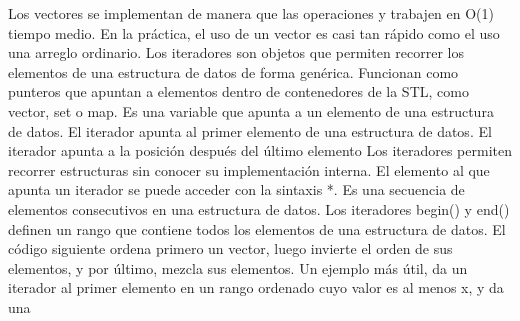 {}Los vectores se implementan de manera que las operaciones  y  trabajen en O(1) tiempo medio.\markdownRendererParagraphSeparator
{}En la práctica, el uso de un vector es casi tan rápido como el uso una arreglo ordinario.\markdownRendererParagraphSeparator
{}
\markdownRendererSectionEnd \markdownRendererSectionBegin
{}\markdownRendererInterblockSeparator
{}Los iteradores son objetos que permiten recorrer los elementos de una estructura de datos de forma genérica.\markdownRendererSoftLineBreak
{}Funcionan como punteros que apuntan a elementos dentro de contenedores de la STL, como vector, set o map.\markdownRendererInterblockSeparator
{}\markdownRendererSectionBegin
{}\markdownRendererInterblockSeparator
{}Es una variable que apunta a un elemento de una estructura de datos.\markdownRendererInterblockSeparator
{}\markdownRendererUlBegin
\markdownRendererUlItem El iterador  apunta al primer elemento de una estructura de datos.\markdownRendererUlItemEnd 
\markdownRendererUlItem El iterador  apunta a la posición después del último elemento\markdownRendererUlItemEnd 
\markdownRendererUlEnd \markdownRendererInterblockSeparator
{}Los iteradores permiten recorrer estructuras sin conocer su implementación interna.\markdownRendererParagraphSeparator
{}El elemento al que apunta un iterador se puede acceder con la sintaxis *.\markdownRendererInterblockSeparator
{}\markdownRendererInterblockSeparator
{}
\markdownRendererSectionEnd \markdownRendererSectionBegin
{}\markdownRendererInterblockSeparator
{}Es una secuencia de elementos consecutivos en una estructura de datos.\markdownRendererParagraphSeparator
{}Los iteradores begin() y end() definen un rango que contiene todos los elementos de una estructura de datos.\markdownRendererParagraphSeparator
{}El código siguiente ordena primero un vector, luego invierte el orden de sus elementos, y por último, mezcla sus elementos.\markdownRendererInterblockSeparator
{}\markdownRendererInterblockSeparator
{}Un ejemplo más útil, da un iterador al primer elemento en un rango ordenado cuyo valor es al menos x, y  da una\markdownRendererSoftLineBreak
